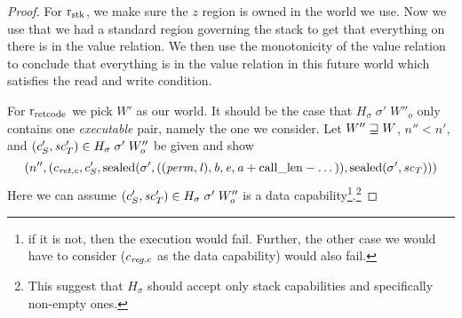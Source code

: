 \documentclass[a4paper]{article}
\begin{document}
\begin{proof}
For $\rstk$, we make sure the $z$ region is owned in the world we use. Now we use that we had a standard region governing the stack to get that everything on there is in the value relation. We then use the monotonicity of the value relation to conclude that everything is in the value relation in this future world which satisfies the read and write condition.

For $\rretc$ we pick $W'$ as our world. It should be the case that $H_\sigma \; \sigma' \; W''_o$ only contains one \emph{executable} pair, namely the one we consider. Let $W'' \future W$, $n''<n'$, and $(c_S',\vsc_T') \in H_\sigma \; \sigma' \; W''_o$ be given and show
\[
  \npair[n'']{(c_{\ret,c},c_S',\sealed{\sigma',((\perm,\lin),\baddr,\eaddr,\aaddr+\calllen-\dots)},\sealed{\sigma',\vsc_T})}
\]
Here we can assume $(c_S',\vsc_T') \in H_\sigma \; \sigma' \;W''_o$ is a data capability\footnote{if it is not, then the execution would fail. Further, the other case we would have to consider ($c_{\reg,c}$ as the data capability) would also fail.}.\footnote{{\color{red}This suggest that $H_\sigma$ should accept only stack capabilities and specifically non-empty ones.}}



\end{proof}
\end{document}
